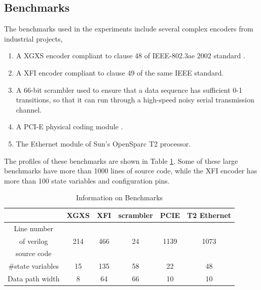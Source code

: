 \documentclass[runningheads,a4paper]{llncs}
\begin{document}
\subsection{Benchmarks}
The benchmarks used in the experiments include several complex encoders from industrial projects,
\begin{enumerate}
\item A XGXS encoder compliant to clause 48 of IEEE-802.3ae 2002 standard .
\item A XFI encoder compliant to clause 49 of the same IEEE standard.
\item A 66-bit scrambler used to ensure
that a data sequence has sufficient 0-1 transitions,
so that it can run through a high-speed
noisy serial transmission channel.
\item A PCI-E physical coding module .
\item The Ethernet module of Sun's OpenSparc T2 processor.
\end{enumerate}

The profiles of these benchmarks are shown in Table \ref{tab_benchmark}.
Some of these large benchmarks have more than 1000 lines of source code,
while the XFI encoder has more than 100 state variables and configuration pins.


\begin{table}[t]
\centering
\caption{Information on Benchmarks}
\begin{tabular}{|c|c|c|c|c|c|}
\hline
&XGXS&XFI&scrambler&PCIE&T2 Ethernet\\\hline\hline
Line number&&&&&\\
of verilog&214&466&24&1139&1073\\
source code&&&&&\\\hline
\#state variables&15&135&58&22&48\\\hline
Data path width&8&64&66&10&10\\\hline
\end{tabular}\label{tab_benchmark}
\end{table}
\end{document}
